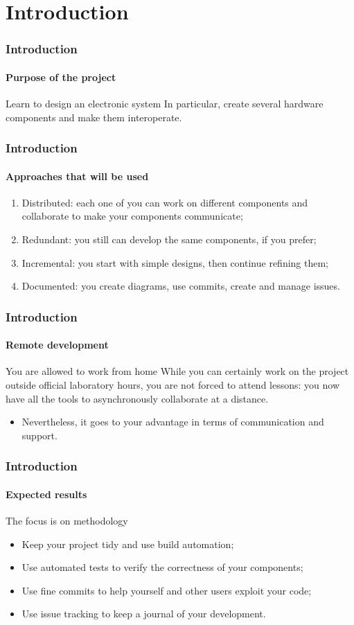\section{Introduction}

\begin{frame}
\frametitle{Introduction}
\framesubtitle{Purpose of the project}

\begin{block}{Learn to design an electronic system}
In particular, create several hardware components and make them interoperate.
\end{block}
\end{frame}

\begin{frame}
\frametitle{Introduction}
\framesubtitle{Approaches that will be used}

\begin{enumerate}
\item Distributed: each one of you can work on different components and collaborate to make your components communicate;
\pause
\item Redundant: you still can develop the same components, if you prefer;
\pause
\item Incremental: you start with simple designs, then continue refining them;
\pause
\item Documented: you create diagrams, use commits, create and manage issues.
\end{enumerate}
\end{frame}

\begin{frame}
\frametitle{Introduction}
\framesubtitle{Remote development}

\begin{block}{You are allowed to work from home}
While you can certainly work on the project outside official laboratory hours, you are not forced to attend lessons: you
now have all the tools to asynchronously collaborate at a distance.
\begin{itemize}
\item Nevertheless, it goes to your advantage in terms of communication and support.
\end{itemize}
\end{block}
\end{frame}

\begin{frame}
\frametitle{Introduction}
\framesubtitle{Expected results}

\begin{block}{The focus is on methodology}
\begin{itemize}
\item Keep your project tidy and use build automation;
\item Use automated tests to verify the correctness of your components;
\item Use fine commits to help yourself and other users exploit your code;
\item Use issue tracking to keep a journal of your development.
\end{itemize}
\end{block}
\end{frame}

